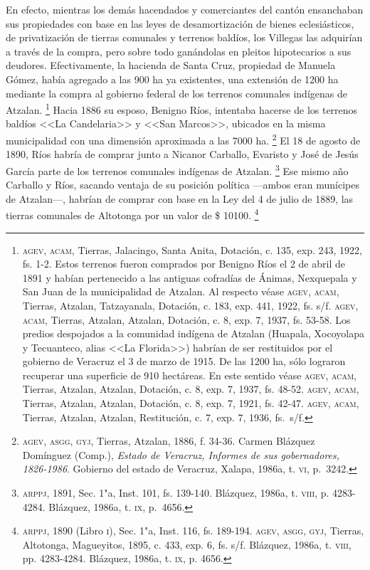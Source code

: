 \documentclass[14pt,twoside,final]{extbook} %
\let\oldfootnote\footnote
\renewcommand\footnote[1]{%
\oldfootnote{\hspace{1mm}#1}}
\begin{document}
En efecto, mientras los demás hacendados y comerciantes del cantón ensanchaban sus propiedades con base en las leyes de desamortización de bienes eclesiásticos, de privatización de tierras comunales y terrenos baldíos, los Villegas las adquirían a través de la compra, pero sobre todo ganándolas en pleitos hipotecarios a sus deudores. Efectivamente, la hacienda de Santa Cruz, propiedad de Manuela Gómez, había agregado a las 900 ha ya existentes, una extensión de 1200 ha mediante la compra al gobierno federal de los terrenos comunales indígenas de Atzalan.\footnote{\textsc{agev, acam}, Tierras, Jalacingo, Santa Anita, Dotación, c. 135, exp. 243, 1922, fs. 1-2. Estos terrenos fueron comprados por Benigno Ríos el 2 de abril de 1891 y habían pertenecido a las antiguas cofradías de Ánimas, Nexquepala y San Juan de la municipalidad de Atzalan. Al respecto véase \textsc{agev}, \textsc{acam}, Tierras, Atzalan, Tatzayanala, Dotación, c. 183, exp. 441, 1922, fs. s/f. \textsc{agev}, \textsc{acam}, Tierras, Atzalan, Atzalan, Dotación, c. 8, exp. 7, 1937, fs. 53-58. Los predios despojados a la comunidad indígena de Atzalan (Huapala, Xocoyolapa y Tecuanteco, alias <<La Florida>>) habrían de ser restituidos por el gobierno de Veracruz el 3 de marzo de 1915. De las 1200 ha, sólo lograron recuperar una superficie de 910 hectáreas. En este sentido véase \textsc{agev}, \textsc{acam}, Tierras, Atzalan, Atzalan, Dotación, c. 8, exp. 7, 1937, fs. 48-52. \textsc{agev}, \textsc{acam}, Tierras, Atzalan, Atzalan, Dotación, c. 8, exp. 7, 1921, fs. 42-47. \textsc{agev}, \textsc{acam}, Tierras, Atzalan, Atzalan, Restitución, c. 7, exp. 7, 1936, fs.~s/f.} Hacia 1886 su esposo, Benigno Ríos, intentaba hacerse de los terrenos baldíos <<La Candelaria>> y <<San Marcos>>, ubicados en la misma municipalidad con una dimensión aproximada a las 7000 ha.\footnote{\textsc{agev, asgg, gyj}, Tierras, Atzalan, 1886, f. 34-36. Carmen Blázquez Domínguez (Comp.), \emph{Estado de Veracruz, Informes de sus gobernadores, 1826-1986}. Gobierno del estado de Veracruz, Xalapa, 1986a, t. \textsc{vi}, p.~3242.} El 18 de agosto de 1890, Ríos habría de comprar junto a Nicanor Carballo, Evaristo y José de Jesús García parte de los terrenos comunales indígenas de Atzalan.\footnote{\textsc{arppj}, 1891, Sec. 1"a, Inst. 101, fs. 139-140. Blázquez, 1986a, t. \textsc{viii}, p. 4283-4284. Blázquez, 1986a, t. \textsc{ix}, p.~4656.} Ese mismo año Carballo y Ríos, sacando ventaja de su posición política ---ambos eran munícipes de Atzalan---, habrían de comprar con base en la Ley del 4 de julio de 1889, las tierras comunales de Altotonga por un valor de \$ 10100.\footnote{\textsc{arppj}, 1890 (Libro \textsc{i}), Sec. 1"a, Inst. 116, fs. 189-194. \textsc{agev, asgg, gyj}, Tierras, Altotonga, Magueyitos, 1895, c. 433, exp. 6, fs. s/f. Blázquez, 1986a, t. \textsc{viii}, pp. 4283-4284. Blázquez, 1986a, t. \textsc{ix}, p. 4656.}
\end{document}
